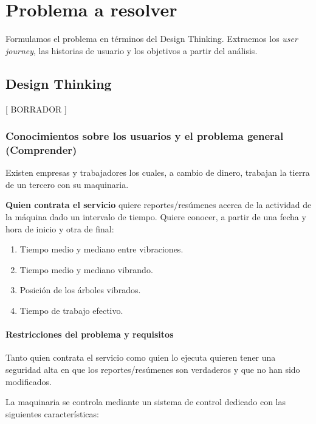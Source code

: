 \chapter{Problema a resolver}


Formulamos el problema en términos del Design Thinking. Extraemos los \textit{user journey},
las historias de usuario y los objetivos a partir del análisis.

\section{Design Thinking}

[ BORRADOR ]

\subsection{Conocimientos sobre los usuarios y el problema general (Comprender)}

Existen empresas y trabajadores los cuales, a cambio de dinero, trabajan la
tierra de un tercero con su maquinaria.

\textbf{Quien contrata el servicio} quiere reportes/resúmenes acerca de la actividad
de la máquina dado un intervalo de tiempo. Quiere conocer, a partir de una fecha y hora de inicio y otra de final:

\begin{enumerate}
   \item Tiempo medio y mediano entre vibraciones.
   \item Tiempo medio y mediano vibrando.
   \item Posición de los árboles vibrados.
   \item Tiempo de trabajo efectivo.
\end{enumerate}

\subsubsection{Restricciones del problema y requisitos}

Tanto quien contrata el servicio como quien lo ejecuta quieren tener una seguridad alta
en que los reportes/resúmenes son verdaderos y que no han sido modificados.

La maquinaria se controla mediante un sistema de control dedicado con las
siguientes características:

